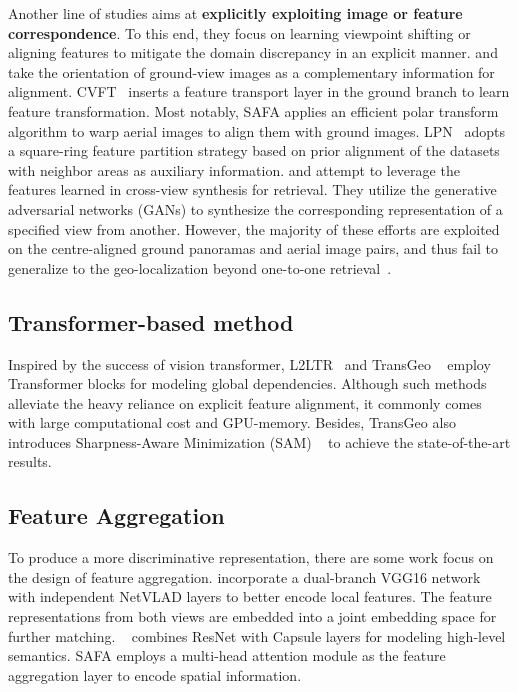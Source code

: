 \documentclass[sn-basic,iicol]{sn-jnl}
\theoremstyle{thmstyletwo}\newtheorem{example}{Example}\newtheorem{remark}{Remark}
\theoremstyle{thmstylethree}\newtheorem{definition}{Definition}
\begin{document}
Another line of studies aims at {\bf explicitly exploiting image or feature correspondence}. To this end, they focus on learning viewpoint shifting or aligning features to mitigate the domain discrepancy in an explicit manner. \cite{liu2019lending} and \cite{DSM2020} take the orientation of ground-view images as a complementary information for alignment. CVFT~\citep{CVFT2020} inserts a feature transport layer in the ground branch to learn feature transformation. Most notably, SAFA applies an efficient polar transform algorithm to warp aerial images to align them with ground images. LPN~\citep{wang2021LPN} adopts a square-ring feature partition strategy based on prior alignment of the datasets with neighbor areas as auxiliary information. \cite{regmi2019bridging} and \cite{coming2021} attempt to leverage the features learned in cross-view synthesis for retrieval. They utilize the generative adversarial networks (GANs) to synthesize the corresponding representation of a specified view from another. However, the majority of these efforts are exploited on the centre-aligned ground panoramas and aerial image pairs, and thus fail to generalize to the geo-localization beyond one-to-one retrieval~\citep{VIGOR2021}.




\subsection{Transformer-based method}
Inspired by the success of vision transformer, L2LTR~\citep{L2LTR2021} and TransGeo ~\citep{zhu2022transgeo} employ Transformer blocks for modeling global dependencies. Although such methods alleviate the heavy reliance on explicit feature alignment, it commonly comes with large computational cost and GPU-memory. Besides, TransGeo also introduces Sharpness-Aware Minimization (SAM) ~\citep{foret2020sharpness} to achieve the state-of-the-art results.
 
\subsection{Feature Aggregation}
To produce a more discriminative representation, there are some work focus on the design of feature aggregation. \cite{hu2018cvm} incorporate a dual-branch VGG16 network with independent NetVLAD layers to better encode local features. The feature representations from both views are embedded into a joint embedding space for further matching. ~\cite{sun2019geocapsnet} combines ResNet with Capsule layers for modeling high-level semantics. SAFA \citep{SAFA2019} employs a multi-head attention module as the feature aggregation layer to encode spatial information.
\end{document}
